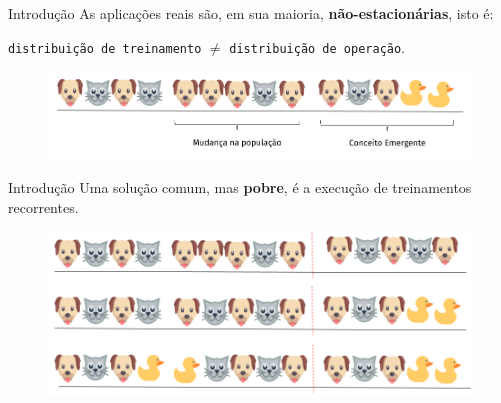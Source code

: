 \documentclass[10pt]{beamer}
\begin{document}
\begin{frame}{Introdução}
    As aplicações reais são, em sua maioria, \textbf{não-estacionárias}, isto é:

    \texttt{distribuição de treinamento} $\neq$ \texttt{distribuição de operação}.

    \begin{figure}[H]
        \begin{center}
            \includegraphics[scale=0.45]{mudanca_populacao_conceitos_emergentes.png}
        \end{center}
    \end{figure}
\end{frame}

\begin{frame}{Introdução}
    Uma solução comum, mas \textbf{pobre}, é a execução de treinamentos recorrentes.

    \begin{figure}[H]
        \begin{center}
            \includegraphics[scale=0.45]{treinamentos_recorrentes.png}
        \end{center}
    \end{figure}
\end{frame}
\end{document}
